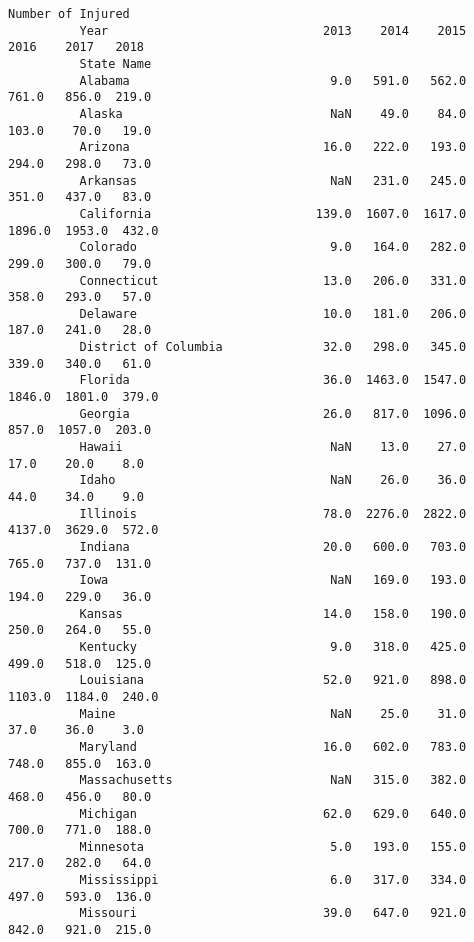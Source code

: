 \documentclass[11pt]{article}
\begin{document}
\begin{Verbatim}[commandchars=\\\{\}]
                               Number of Injured                                         
          Year                              2013    2014    2015    2016    2017   2018  
          State Name                                                                     
          Alabama                            9.0   591.0   562.0   761.0   856.0  219.0  
          Alaska                             NaN    49.0    84.0   103.0    70.0   19.0  
          Arizona                           16.0   222.0   193.0   294.0   298.0   73.0  
          Arkansas                           NaN   231.0   245.0   351.0   437.0   83.0  
          California                       139.0  1607.0  1617.0  1896.0  1953.0  432.0  
          Colorado                           9.0   164.0   282.0   299.0   300.0   79.0  
          Connecticut                       13.0   206.0   331.0   358.0   293.0   57.0  
          Delaware                          10.0   181.0   206.0   187.0   241.0   28.0  
          District of Columbia              32.0   298.0   345.0   339.0   340.0   61.0  
          Florida                           36.0  1463.0  1547.0  1846.0  1801.0  379.0  
          Georgia                           26.0   817.0  1096.0   857.0  1057.0  203.0  
          Hawaii                             NaN    13.0    27.0    17.0    20.0    8.0  
          Idaho                              NaN    26.0    36.0    44.0    34.0    9.0  
          Illinois                          78.0  2276.0  2822.0  4137.0  3629.0  572.0  
          Indiana                           20.0   600.0   703.0   765.0   737.0  131.0  
          Iowa                               NaN   169.0   193.0   194.0   229.0   36.0  
          Kansas                            14.0   158.0   190.0   250.0   264.0   55.0  
          Kentucky                           9.0   318.0   425.0   499.0   518.0  125.0  
          Louisiana                         52.0   921.0   898.0  1103.0  1184.0  240.0  
          Maine                              NaN    25.0    31.0    37.0    36.0    3.0  
          Maryland                          16.0   602.0   783.0   748.0   855.0  163.0  
          Massachusetts                      NaN   315.0   382.0   468.0   456.0   80.0  
          Michigan                          62.0   629.0   640.0   700.0   771.0  188.0  
          Minnesota                          5.0   193.0   155.0   217.0   282.0   64.0  
          Mississippi                        6.0   317.0   334.0   497.0   593.0  136.0  
          Missouri                          39.0   647.0   921.0   842.0   921.0  215.0  

\end{Verbatim}
\end{document}
